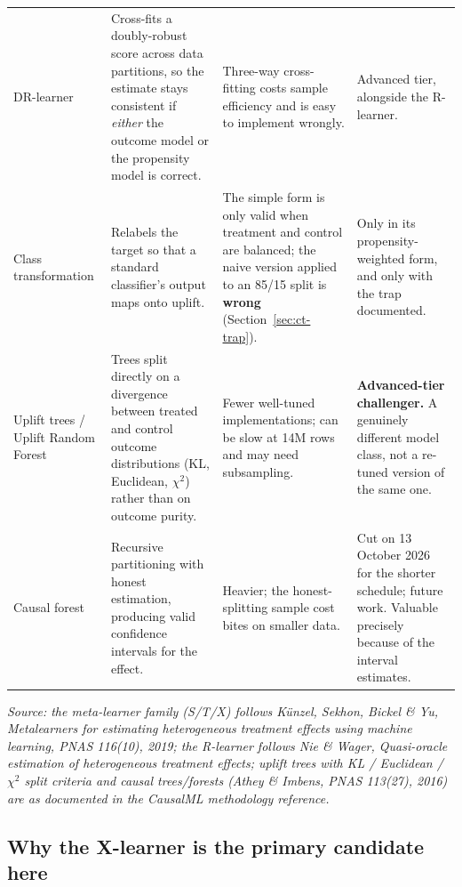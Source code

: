 \documentclass[11pt,a4paper]{article}
\newcommand{\srcnote}[1]{{\footnotesize\itshape\color{teal}Source: #1}}
\begin{document}
\begin{longtable}{@{}L{2.7cm}L{4.5cm}L{4.3cm}L{2.9cm}@{}}
DR-learner &
Cross-fits a doubly-robust score across data partitions, so the estimate stays consistent if
\emph{either} the outcome model or the propensity model is correct. &
Three-way cross-fitting costs sample efficiency and is easy to implement wrongly. &
Advanced tier, alongside the R-learner. \\
\addlinespace
Class transformation &
Relabels the target so that a standard classifier's output maps onto uplift. &
The simple form is only valid when treatment and control are balanced; the naive version applied
to an 85/15 split is \textbf{wrong} (Section~\ref{sec:ct-trap}). &
Only in its propensity-weighted form, and only with the trap documented. \\
\addlinespace
Uplift trees / \newline Uplift Random Forest &
Trees split directly on a divergence between treated and control outcome distributions (KL,
Euclidean, $\chi^2$) rather than on outcome purity. &
Fewer well-tuned implementations; can be slow at 14M rows and may need subsampling. &
\textbf{Advanced-tier challenger.} A genuinely different model class, not a re-tuned version of
the same one. \\
\addlinespace
Causal forest &
Recursive partitioning with honest estimation, producing valid confidence intervals for the effect. &
Heavier; the honest-splitting sample cost bites on smaller data. &
Cut on 13 October 2026 for the shorter schedule; future work. Valuable precisely because of the
interval estimates. \\
\bottomrule
\end{longtable}

\srcnote{the meta-learner family (S/T/X) follows K\"unzel, Sekhon, Bickel \& Yu, \emph{Metalearners
for estimating heterogeneous treatment effects using machine learning}, PNAS 116(10), 2019; the
R-learner follows Nie \& Wager, \emph{Quasi-oracle estimation of heterogeneous treatment effects};
uplift trees with KL / Euclidean / $\chi^2$ split criteria and causal trees/forests (Athey \&
Imbens, PNAS 113(27), 2016) are as documented in the CausalML methodology reference.}

\subsection{Why the X-learner is the primary candidate here}
\label{sec:whyx}
\end{document}
